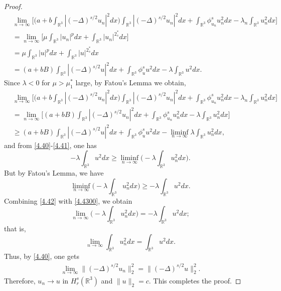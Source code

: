 \documentclass[11pt]{article}
\numberwithin{equation}{section}
\begin{document}
\begin{proof}
\begin{equation}\label{4.40}
\begin{split}
&\lim_{n\to\infty}\Big[\Big(a+b\int_{\mathbb{R}^3}|(-\Delta)^{s/2}u_n|^2dx\Big)
\int_{\mathbb{R}^3}|(-\Delta)^{s/2}u_n|^2 dx+\int_{\mathbb{R}^3}\phi^s_{u_n}{u^2_n}dx
-\lambda_n \int_{\mathbb{R}^3} {u^2_n} dx\Big]\\
&=\lim_{n\to\infty} \Big[\mu \int_{\mathbb{R}^3}|u_n|^{p}dx
 +\int_{\mathbb{R}^3}|u_n|^{2^*_s} dx\Big]\\
&=\mu \int_{\mathbb{R}^3}|u|^{p}dx+\int_{\mathbb{R}^3}|u|^{2^*_s} dx\\
&=(a+bB)\int_{\mathbb{R}^3}|(-\Delta)^{s/2}u|^2 dx+\int_{\mathbb{R}^3}\phi^s_{u}{u^2}dx
 -\lambda \int_{\mathbb{R}^3} {u^2} dx.
\end{split}
\end{equation}
Since $\lambda<0$ for $\mu>\mu^*_1$ large,  by Fatou's Lemma we obtain,
\begin{equation}\label{4.41}
\begin{split}
&\lim_{n\to\infty}\Big[\Big(a+b\int_{\mathbb{R}^3}|(-\Delta)^{s/2}u_n|^2dx\Big)
 \int_{\mathbb{R}^3}|(-\Delta)^{s/2}u_n|^2 dx
 +\int_{\mathbb{R}^3}\phi^s_{u_n}{u^2_n}dx-\lambda_n \int_{\mathbb{R}^3} {u^2_n} dx\Big]\\
&=\lim_{n\to\infty}\Big[(a+bB)\int_{\mathbb{R}^3}|(-\Delta)^{s/2}u_n|^2 dx
 +\int_{\mathbb{R}^3}\phi^s_{u_n}{u^2_n}dx-\lambda \int_{\mathbb{R}^3} {u^2_n} dx\Big]\\
&\geq (a+bB)\int_{\mathbb{R}^3}|(-\Delta)^{s/2}u|^2 dx
 +\int_{\mathbb{R}^3}\phi^s_{u}{u^2}dx-\liminf_{n\to\infty}\lambda 
 \int_{\mathbb{R}^3} {u^2_n} dx,
\end{split}
\end{equation}
and from \eqref{4.40}-\eqref{4.41}, one has
\begin{equation}\label{4.42}
-\lambda \int_{\mathbb{R}^3} {u^2} dx\geq\liminf_{n\to\infty}
 \Big(-\lambda \int_{\mathbb{R}^3} {u^2_n} dx\Big).
\end{equation}
But by Fatou's Lemma, we have
\begin{equation}\label{4.4300}
 \liminf_{n\to\infty}\Big(-\lambda\int_{\mathbb{R}^3} {u^2_n} dx\Big)
 \geq-\lambda \int_{\mathbb{R}^3} {u^2} dx.
\end{equation}
Combining \eqref{4.42} with \eqref{4.4300}, we obtain
\[ \label{earlier-unreferenced-4.43-first}
\lim_{n\to\infty}\Big(-\lambda \int_{\mathbb{R}^3} {u^2_n} dx\Big)
=-\lambda \int_{\mathbb{R}^3} {u^2} dx;
\]
that is,
\[ \label{earlier-unreferenced-4.43-second}
\lim_{n\to\infty} \int_{\mathbb{R}^3} {u^2_n} dx= \int_{\mathbb{R}^3} {u^2} dx.
\]
Thus, by \eqref{4.40}, one gets
\[ \label{4.43}
\begin{split}
\lim_{n\to\infty}  \|(-\Delta)^{s/2}u_n\|^2_2 = \|(-\Delta)^{s/2}u\|^2_2.
\end{split}
\]
Therefore, $u_n\to u$ in $H^s_{r}(\mathbb{R}^3)$ and $\|u\|_2=c$.
 This completes the proof.
\end{proof}
\end{document}
